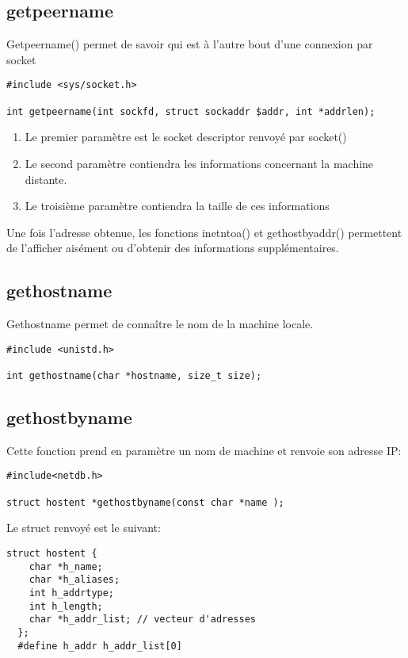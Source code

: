 \documentclass[a4paper]{article}
\begin{document}
\subsection{getpeername}
Getpeername() permet de savoir qui est à l'autre bout d'une connexion par socket
\begin{lstlisting}
#include <sys/socket.h>

int getpeername(int sockfd, struct sockaddr $addr, int *addrlen);
\end{lstlisting}
\begin{enumerate}
  \item Le premier paramètre est le socket descriptor renvoyé par socket()
  \item Le second paramètre contiendra les informations concernant la machine distante.
  \item Le troisième paramètre contiendra la taille de ces informations
\end{enumerate}
Une fois l'adresse obtenue, les fonctions inet\textunderscore{}ntoa() et gethostbyaddr() permettent de l'afficher aisément ou d'obtenir des informations supplémentaires.
\subsection{gethostname}
Gethostname permet de connaître le nom de la machine locale.
\begin{lstlisting}
#include <unistd.h>

int gethostname(char *hostname, size_t size);
\end{lstlisting}
\subsection{gethostbyname}
Cette fonction prend en paramètre un nom de machine et renvoie son adresse IP:
\begin{lstlisting}
#include<netdb.h>

struct hostent *gethostbyname(const char *name );
\end{lstlisting}
Le struct renvoyé est le suivant:
\begin{lstlisting}
struct hostent {
    char *h_name;
    char *h_aliases;
    int h_addrtype;
    int h_length;
    char *h_addr_list; // vecteur d'adresses
  };
  #define h_addr h_addr_list[0]
\end{lstlisting}
\end{document}
